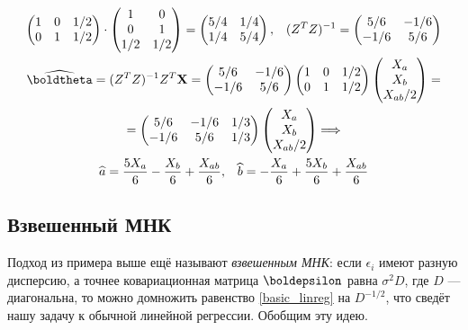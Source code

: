 \begin{example}
\begin{gather*}
\begin{pmatrix}
1 & 0 & 1/2 \\
0 & 1 & 1/2
\end{pmatrix} \cdot 
\begin{pmatrix}
1 & 0\\
0 & 1\\
1/2 & 1/2
\end{pmatrix} = 
\begin{pmatrix}
5/4 & 1/4 \\
1/4 & 5/4
\end{pmatrix},\;\;\;
(Z^T Z)^{-1} = 
\begin{pmatrix}
5/6 & -1/6 \\
-1/6 & 5/6
\end{pmatrix}\\
\widehat{\boldtheta} = (Z^T Z)^{-1} Z^T \mathbf X = 
\begin{pmatrix}
5/6 & -1/6 \\
-1/6 & 5/6
\end{pmatrix}
\begin{pmatrix}
1 & 0 & 1/2 \\
0 & 1 & 1/2
\end{pmatrix}
\begin{pmatrix}
X_a\\
X_b\\
X_{ab} / 2
\end{pmatrix} = \\
= \begin{pmatrix}
5/6 & -1/6 & 1/3\\
-1/6 & 5/6 & 1/3
\end{pmatrix}
\begin{pmatrix}
X_a\\
X_b\\
X_{ab} / 2
\end{pmatrix} \Longrightarrow\\
\widehat{a} = \frac{5X_a}{6} - \frac{X_b}{6} + \frac{X_{ab}}{6},\;\;\;\widehat{b} = -\frac{X_a}{6} + \frac{5X_b}{6} + \frac{X_{ab}}{6}
\end{gather*}
\end{example}

\subsection{Взвешенный МНК}\label{weighted_mnk}

Подход из примера выше ещё называют \textit{взвешенным МНК}: если $\epsilon_i$ имеют разную дисперсию, а точнее ковариационная матрица $\boldepsilon$ равна $\sigma^2D$, где $D$ --- диагональна, то можно домножить равенство \eqref{basic_linreg} на $D^{-1/2}$, что сведёт нашу задачу к обычной линейной регрессии. Обобщим эту идею.

